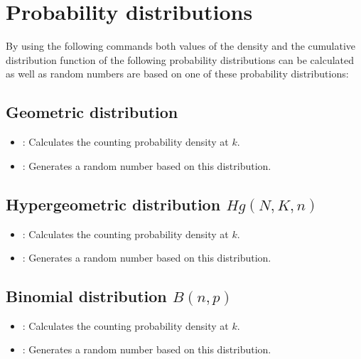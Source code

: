 \chapter{Probability distributions}\label{sec:Wahrscheinlichkeitsverteilungen}

By using the following commands both values of the density and the cumulative distribution function
of the following probability distributions can be calculated as well as random numbers are based on
one of these probability distributions:



\section{Geometric distribution}

\begin{itemize}

\item
{}:
Calculates the counting probability density at $k$.

\item
{}:
Generates a random number based on this distribution.

\end{itemize}



\section{Hypergeometric distribution \texorpdfstring{$Hg(N,K,n)$}{Hg(N,K,n)}}

\begin{itemize}

\item
{}:
Calculates the counting probability density at $k$.

\item
{}:
Generates a random number based on this distribution.

\end{itemize}



\section{Binomial distribution \texorpdfstring{$B(n,p)$}{B(n,p)}}

\begin{itemize}

\item
{}:
Calculates the counting probability density at $k$.

\item
{}:
Generates a random number based on this distribution.

\end{itemize}



